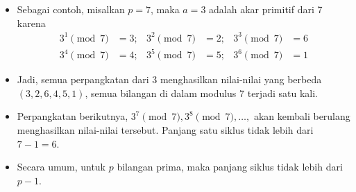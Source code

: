 \documentclass{article}
\begin{document}

\begin{itemize}
  \item Sebagai contoh, misalkan $p = 7$, maka $a = 3$ adalah akar primitif dari 7 karena
  \[ 
  \begin{aligned}
  3^1 \pmod 7 &= 3; & 3^2 \pmod 7 &= 2; & 3^3 \pmod 7 &= 6 \\
  3^4 \pmod 7 &= 4; & 3^5 \pmod 7 &= 5; & 3^6 \pmod 7 &= 1
  \end{aligned}
  \]
  \item Jadi, semua perpangkatan dari 3 menghasilkan nilai-nilai yang berbeda $(3, 2, 6, 4, 5, 1)$, semua bilangan di dalam modulus 7 terjadi satu kali.
  \item Perpangkatan berikutnya, $3^7 \pmod 7, 3^8 \pmod 7, \dots,$ akan kembali berulang menghasilkan nilai-nilai tersebut. Panjang satu siklus tidak lebih dari $7 - 1 = 6$.
  \item Secara umum, untuk $p$ bilangan prima, maka panjang siklus tidak lebih dari $p - 1$.
\end{itemize}
\end{document}
